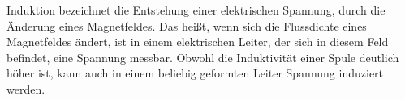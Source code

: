 Induktion bezeichnet die Entstehung einer elektrischen Spannung, durch die Änderung eines Magnetfeldes. Das heißt, wenn sich die Flussdichte eines Magnetfeldes ändert, ist in einem elektrischen Leiter, der sich in diesem Feld befindet, eine Spannung messbar. Obwohl die Induktivität einer Spule deutlich höher ist, kann auch in einem beliebig geformten Leiter Spannung induziert werden.